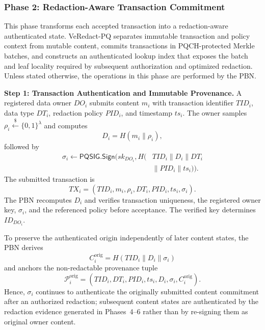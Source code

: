 \documentclass[lettersize,journal]{IEEEtran}
\begin{document}
    
    
   \subsubsection*{\textbf{Phase 2: Redaction-Aware Transaction Commitment}}

This phase transforms each accepted transaction into a redaction-aware
authenticated state. VeRedact-PQ separates immutable transaction and
policy context from mutable content, commits transactions in
PQCH-protected Merkle batches, and constructs an authenticated lookup
index that exposes the batch and leaf locality required by subsequent
authorization and optimized redaction. Unless stated otherwise, the
operations in this phase are performed by the PBN.

\medskip
\noindent\textbf{Step 1: Transaction Authentication and Immutable
Provenance.}
A registered data owner $DO_i$ submits content $m_i$ with transaction
identifier $TID_i$, data type $DT_i$, redaction policy $PID_i$, and
timestamp $ts_i$. The owner samples
$\rho_i\stackrel{\$}{\leftarrow}\{0,1\}^{\lambda}$ and computes
\begin{equation}
D_i=H(m_i\parallel\rho_i),
\end{equation}
followed by
\begin{equation}
\begin{aligned}
\sigma_i\leftarrow
\mathsf{PQSIG.Sign}\big(
sk_{DO_i},
H(&TID_i\parallel D_i\parallel DT_i\\
&\parallel PID_i\parallel ts_i)\big).
\end{aligned}
\end{equation}
The submitted transaction is
\begin{equation}
TX_i=(TID_i,m_i,\rho_i,DT_i,PID_i,ts_i,\sigma_i).
\end{equation}
The PBN recomputes $D_i$ and verifies transaction uniqueness, the
registered owner key, $\sigma_i$, and the referenced policy before
acceptance. The verified key determines $ID_{DO_i}$.

To preserve the authenticated origin independently of later content
states, the PBN derives
\begin{equation}
C_i^{\mathrm{orig}}
=
H(TID_i\parallel D_i\parallel\sigma_i)
\end{equation}
and anchors the non-redactable provenance tuple
\begin{equation}
\mathcal{P}_i^{\mathrm{orig}}
=
(TID_i,DT_i,PID_i,ts_i,D_i,\sigma_i,C_i^{\mathrm{orig}}).
\end{equation}
Hence, $\sigma_i$ continues to authenticate the originally submitted
content commitment after an authorized redaction; subsequent content
states are authenticated by the redaction evidence generated in
Phases~4--6 rather than by re-signing them as original owner content.
\end{document}
